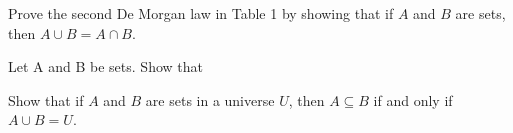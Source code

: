 \documentclass{exam}
\begin{document}
\begin{questions}


\question Prove the second De Morgan law in Table 1 by showing that if $A$ and $B$ are sets, then $A \cup B = A \cap B$.



\question Let A and B be sets. Show that


\question Show that if $A$ and $B$ are sets in a universe $U$, then $A \subseteq B$ if and only if $A \cup B = U$.

\vspace{9in}


\end{questions}
\end{document}
